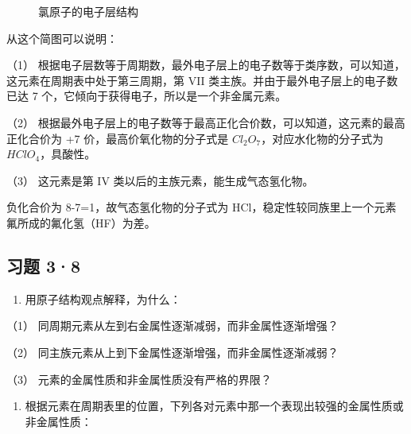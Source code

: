 \begin{figure}
\centering
{}
\caption{氯原子的电子层结构}
\end{figure}

从这个简图可以说明：

（1）
根据电子层数等于周期数，最外电子层上的电子数等于类序数，可以知道，这元素在周期表中处于第三周期，第
VII 类主族。并由于最外电子层上的电子数已达 7
个，它倾向于获得电子，所以是一个非金属元素。

（2）
根据最外电子层上的电子数等于最高正化合价数，可以知道，这元素的最高正化合价为
+7 价，最高价氧化物的分子式是 \(Cl_{2}O_{7}\)，对应水化物的分子式为
\(HClO_{4}\)，具酸性。

（3） 这元素是第 IV 类以后的主族元素，能生成气态氢化物。

负化合价为 8-7=1，故气态氢化物的分子式为
HCl，稳定性较同族里上一个元素氟所成的氟化氢（HF）为差。

\subsection{习题 3·8}

\begin{enumerate}
\item
  用原子结构观点解释，为什么：
\end{enumerate}

（1） 同周期元素从左到右金属性逐渐减弱，而非金属性逐渐增强？

（2） 同主族元素从上到下金属性逐渐增强，而非金属性逐渐减弱？

（3） 元素的金属性质和非金属性质没有严格的界限？

\begin{enumerate}[start=2]
\item
  根据元素在周期表里的位置，下列各对元素中那一个表现出较强的金属性质或非金属性质：
\end{enumerate}


